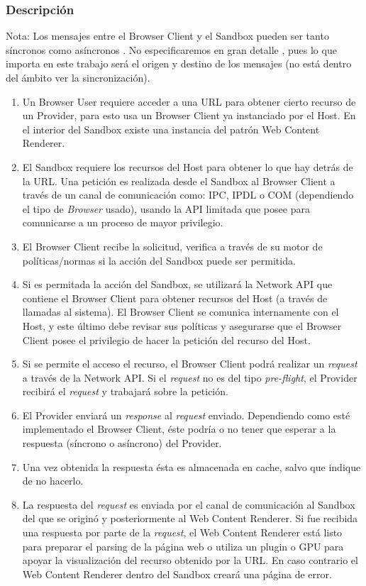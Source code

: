 \subsubsection{Descripción}
Nota: Los mensajes entre el Browser Client y el Sandbox pueden ser tanto síncronos como asíncronos \cite{firefoxIPC,GCIPC}. No especificaremos en gran detalle , pues lo que importa en este trabajo será el origen y destino de los mensajes (no está dentro del ámbito ver la sincronización).
	\begin{enumerate}
		\item Un Browser User requiere acceder a una URL para obtener cierto recurso de un Provider, para esto usa un Browser Client ya instanciado por el Host. En el interior del Sandbox existe una instancia del patrón Web Content Renderer. 
		\item El Sandbox requiere los recursos del Host para obtener lo que hay detrás de la URL. Una petición es realizada desde el Sandbox al Browser Client a través de un canal de comunicación como: IPC, IPDL o COM (dependiendo el tipo de \textit{Browser} usado), usando la API limitada que posee para comunicarse a un proceso de mayor privilegio. 
		\item El Browser Client recibe la solicitud, verifica a través de su motor de políticas/normas si la acción del Sandbox puede ser permitida.
		\item Si es permitada la acción del Sandbox, se utilizará la Network API que contiene el Browser Client para obtener recursos del Host (a través de llamadas al sistema). El Browser Client se comunica internamente con el Host, y este último debe revisar sus políticas y asegurarse que el Browser Client posee el privilegio de hacer la petición del recurso del Host.
		\item Si se permite el acceso el recurso, el Browser Client podrá realizar un \textit{request} a través de la Network API. Si el \textit{request} no es del tipo \textit{pre-flight}, el Provider recibirá el \textit{request} y trabajará sobre la petición.
		\item El Provider enviará un \textit{response} al \textit{request} enviado. Dependiendo como esté implementado el Browser Client, éste podría o no tener que esperar a la respuesta (síncrono o asíncrono) del Provider.
		\item Una vez obtenida la respuesta ésta es almacenada en cache, salvo que indique de no hacerlo.
		\item La respuesta del \textit{request} es enviada por el canal de comunicación al Sandbox del que se originó y posteriormente al Web Content Renderer. Si fue recibida una respuesta por parte de la \textit{request}, el Web Content Renderer está listo para preparar el parsing de la página web o utiliza un plugin o GPU para apoyar la visualización del recurso obtenido por la URL. En caso contrario el Web Content Renderer dentro del Sandbox creará una página de error.

\end{enumerate}
